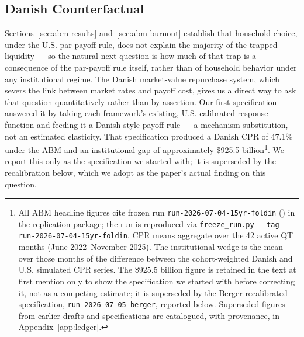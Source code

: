 \documentclass[12pt]{article}
\begin{document}
\subsection{Danish Counterfactual}\label{sec:abm-danish}

Sections~\ref{sec:abm-results} and~\ref{sec:abm-burnout} establish that household choice, under the U.S. par-payoff rule, does not explain the majority of the trapped liquidity --- so the natural next question is how much of that trap is a consequence of the par-payoff rule itself, rather than of household behavior under any institutional regime. The Danish market-value repurchase system, which severs the link between market rates and payoff cost, gives us a direct way to ask that question quantitatively rather than by assertion. Our first specification answered it by taking each framework's existing, U.S.-calibrated response function and feeding it a Danish-style payoff rule --- a mechanism substitution, not an estimated elasticity. That specification produced a Danish CPR of 47.1\% under the ABM and an institutional gap of approximately \$925.5 billion\footnote{\label{fn:manifest}All ABM headline figures cite frozen run \texttt{run-2026-07-04-15yr-foldin} () in the replication package; the run is reproduced via \texttt{freeze\_run.py -{}-tag run-2026-07-04-15yr-foldin}. CPR means aggregate over the 42 active QT months (June 2022--November 2025). The institutional wedge is the mean over those months of the difference between the cohort-weighted Danish and U.S. simulated CPR series. The \$925.5 billion figure is retained in the text at first mention only to show the specification we started with before correcting it, not as a competing estimate; it is superseded by the Berger-recalibrated specification, \texttt{run-2026-07-05-berger}, reported below. Superseded figures from earlier drafts and specifications are catalogued, with provenance, in Appendix~\ref{app:ledger}.}. We report this only as the specification we started with; it is superseded by the recalibration below, which we adopt as the paper's actual finding on this question.
\end{document}
